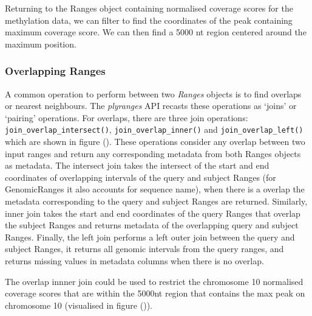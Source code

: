 \documentclass[10pt,letterpaper]{article}
\newenvironment{Shaded}{\begin{snugshade}}{\end{snugshade}}
\newcommand{\DecValTok}[1]{\textcolor[rgb]{0.00,0.00,0.81}{#1}}
\newcommand{\KeywordTok}[1]{\textcolor[rgb]{0.13,0.29,0.53}{\textbf{#1}}}
\newcommand{\NormalTok}[1]{#1}
\newcommand{\OperatorTok}[1]{\textcolor[rgb]{0.81,0.36,0.00}{\textbf{#1}}}
\newcommand{\StringTok}[1]{\textcolor[rgb]{0.31,0.60,0.02}{#1}}
\begin{document}
Returning to the Ranges object containing normalised coverage scores for
the methylation data, we can filter to find the coordinates of the peak
containing maximum coverage score. We can then find a 5000 nt region
centered around the maximum position.

\begin{Shaded}
\end{Shaded}

\hypertarget{overlapping-ranges}{%
\subsubsection{Overlapping Ranges}\label{overlapping-ranges}}

A common operation to perform between two \emph{Ranges} objects is to
find overlaps or nearest neighbours. The \emph{plyranges} API recasts
these operations as `joins' or `pairing' operations. For overlaps, there
are three join operations: \texttt{join\_overlap\_intersect()},
\texttt{join\_overlap\_inner()} and \texttt{join\_overlap\_left()} which
are shown in figure (). These operations consider any overlap between
two input ranges and return any corresponding metadata from both Ranges
objects as metadata. The intersect join takes the intersect of the start
and end coordinates of overlapping intervals of the query and subject
Ranges (for GenomicRanges it also accounts for sequence name), when
there is a overlap the metadata corresponding to the query and subject
Ranges are returned. Similarly, inner join takes the start and end
coordinates of the query Ranges that overlap the subject Ranges and
returns metadata of the overlapping query and subject Ranges. Finally,
the left join performs a left outer join between the query and subject
Ranges, it returns all genomic intervals from the query ranges, and
returns missing values in metadata columns when there is no overlap.

The overlap innner join could be used to restrict the chromosome 10
normalised coverage scores that are within the 5000nt region that
contains the max peak on chromosome 10 (visualised in figure ()).
\end{document}
